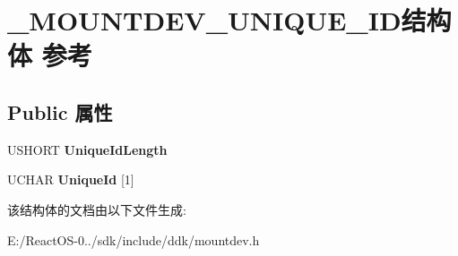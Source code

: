 \hypertarget{struct___m_o_u_n_t_d_e_v___u_n_i_q_u_e___i_d}{}\section{\+\_\+\+M\+O\+U\+N\+T\+D\+E\+V\+\_\+\+U\+N\+I\+Q\+U\+E\+\_\+\+I\+D结构体 参考}
\label{struct___m_o_u_n_t_d_e_v___u_n_i_q_u_e___i_d}
\subsection*{Public 属性}
\begin{DoxyCompactItemize}
\item 
\mbox{\label{struct___m_o_u_n_t_d_e_v___u_n_i_q_u_e___i_d_a15c00cc34f4be4a1dac0285eb1a17b55}} 
U\+S\+H\+O\+RT {\bfseries Unique\+Id\+Length}
\item 
\mbox{\label{struct___m_o_u_n_t_d_e_v___u_n_i_q_u_e___i_d_a53566dbc2fed6ce57bb6ceb63886f377}} 
U\+C\+H\+AR {\bfseries Unique\+Id} \mbox{[}1\mbox{]}
\end{DoxyCompactItemize}


该结构体的文档由以下文件生成\+:\begin{DoxyCompactItemize}
\item 
E\+:/\+React\+O\+S-\/0../sdk/include/ddk/mountdev.\+h\end{DoxyCompactItemize}
